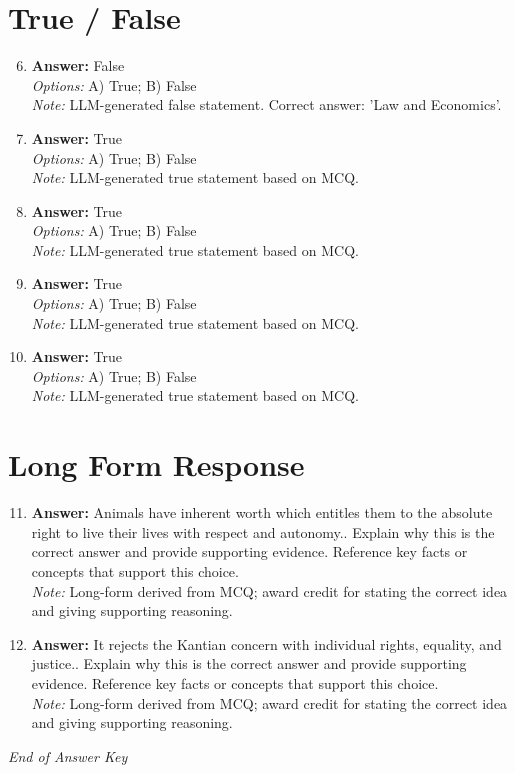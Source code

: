 \documentclass[12pt]{article}
\begin{document}
\section*{True / False}
\begin{enumerate}[label=\arabic*.]
\setcounter{enumi}{5}
\item \textbf{Answer:} False
\\ \textit{Options:} A) True; B) False
\\ \textit{Note:} LLM-generated false statement. Correct answer: 'Law and Economics'.
\item \textbf{Answer:} True
\\ \textit{Options:} A) True; B) False
\\ \textit{Note:} LLM-generated true statement based on MCQ.
\item \textbf{Answer:} True
\\ \textit{Options:} A) True; B) False
\\ \textit{Note:} LLM-generated true statement based on MCQ.
\item \textbf{Answer:} True
\\ \textit{Options:} A) True; B) False
\\ \textit{Note:} LLM-generated true statement based on MCQ.
\item \textbf{Answer:} True
\\ \textit{Options:} A) True; B) False
\\ \textit{Note:} LLM-generated true statement based on MCQ.
\end{enumerate}

\section*{Long Form Response}
\begin{enumerate}[label=\arabic*.]
\setcounter{enumi}{10}
\item \textbf{Answer:} Animals have inherent worth which entitles them to the absolute right to live their lives with respect and autonomy.. Explain why this is the correct answer and provide supporting evidence. Reference key facts or concepts that support this choice.
\\ \textit{Note:} Long-form derived from MCQ; award credit for stating the correct idea and giving supporting reasoning.
\item \textbf{Answer:} It rejects the Kantian concern with individual rights, equality, and justice.. Explain why this is the correct answer and provide supporting evidence. Reference key facts or concepts that support this choice.
\\ \textit{Note:} Long-form derived from MCQ; award credit for stating the correct idea and giving supporting reasoning.
\end{enumerate}

\vfill
\noindent\textit{End of Answer Key}
\end{document}

